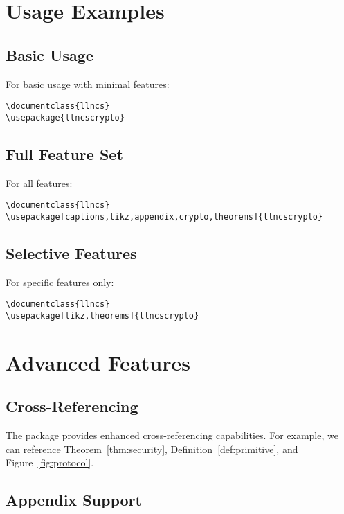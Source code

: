 \documentclass{llncs}
\begin{document}
\section{Usage Examples}

\subsection{Basic Usage}

For basic usage with minimal features:

\begin{verbatim}
\documentclass{llncs}
\usepackage{llncscrypto}
\end{verbatim}

\subsection{Full Feature Set}

For all features:

\begin{verbatim}
\documentclass{llncs}
\usepackage[captions,tikz,appendix,crypto,theorems]{llncscrypto}
\end{verbatim}

\subsection{Selective Features}

For specific features only:

\begin{verbatim}
\documentclass{llncs}
\usepackage[tikz,theorems]{llncscrypto}
\end{verbatim}

\section{Advanced Features}

\subsection{Cross-Referencing}

The package provides enhanced cross-referencing capabilities. For example, we
can reference Theorem~\ref{thm:security}, Definition~\ref{def:primitive}, and
Figure~\ref{fig:protocol}.

\subsection{Appendix Support}
\end{document}
